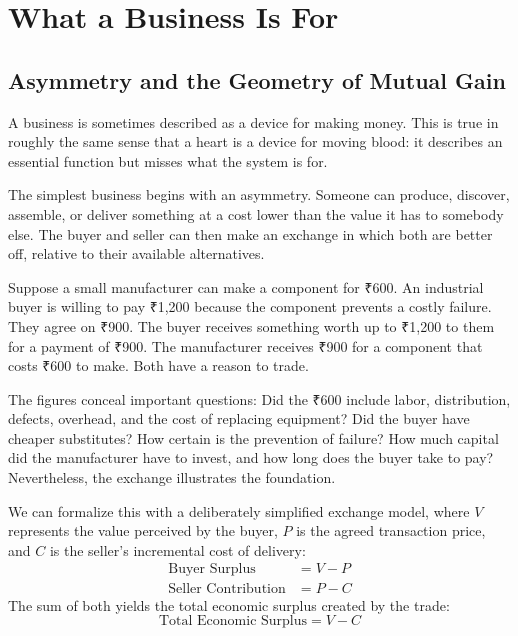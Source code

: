 \section{What a Business Is For}

\subsection{Asymmetry and the Geometry of Mutual Gain}

A business is sometimes described as a device for making money. This is true in roughly the same sense that a heart is a device for moving blood: it describes an essential function but misses what the system is for.

The simplest business begins with an asymmetry. Someone can produce, discover, assemble, or deliver something at a cost lower than the value it has to somebody else. The buyer and seller can then make an exchange in which both are better off, relative to their available alternatives.

Suppose a small manufacturer can make a component for ₹600. An industrial buyer is willing to pay ₹1,200 because the component prevents a costly failure. They agree on ₹900. The buyer receives something worth up to ₹1,200 to them for a payment of ₹900. The manufacturer receives ₹900 for a component that costs ₹600 to make. Both have a reason to trade.

The figures conceal important questions: Did the ₹600 include labor, distribution, defects, overhead, and the cost of replacing equipment? Did the buyer have cheaper substitutes? How certain is the prevention of failure? How much capital did the manufacturer have to invest, and how long does the buyer take to pay? Nevertheless, the exchange illustrates the foundation.

We can formalize this with a deliberately simplified exchange model, where $V$ represents the value perceived by the buyer, $P$ is the agreed transaction price, and $C$ is the seller's incremental cost of delivery:
{\setlength{\abovedisplayskip}{3pt plus 1pt minus 1pt}
\setlength{\belowdisplayskip}{3pt plus 1pt minus 1pt}
\begin{align}
  \text{Buyer Surplus} &= V - P \label{eq:buyer-surplus} \\[2pt]
  \text{Seller Contribution} &= P - C \label{eq:seller-contribution}
\end{align}
The sum of both yields the total economic surplus created by the trade:
\begin{equation}
  \text{Total Economic Surplus} = V - C \label{eq:total-surplus}
\end{equation}}

